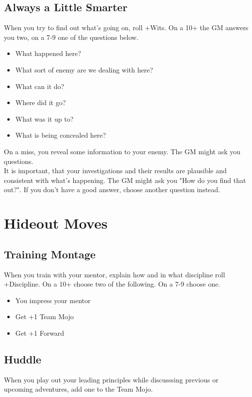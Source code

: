 \documentclass{book}
\begin{document}
\section*{Always a Little Smarter}
When you try to find out what's going on, roll +Wits. On a 10+ the GM answers you two, on a 7-9 one of the questions below.
\begin{itemize}
    \item What happened here?
    \item What sort of enemy are we dealing with here?
    \item What can it do?
    \item Where did it go?
    \item What was it up to?
    \item What is being concealed here?
\end{itemize}
On a miss, you reveal some information to your enemy. The GM might ask you questions.\\
It is important, that your investigations and their results are plausible and consistent with what's happening. The GM might ask you "How do you find that out?". If you don't have a good answer, choose another question instead.

\chapter*{Hideout Moves}
\section*{Training Montage}
When you train with your mentor, explain how and in what discipline roll +Discipline. On a 10+ choose two of the following. On a 7-9 choose one.
\begin{itemize}
    \item You impress your mentor
    \item Get +1 Team Mojo
    \item Get +1 Forward
\end{itemize}

\section*{Huddle}
When you play out your leading principles while discusssing previous or upcoming adventures, add one to the Team Mojo.
\end{document}
